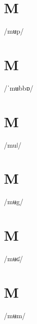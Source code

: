 \documentclass[10pt,a4paper,twoside]{book}
\begin{document}
\section*{M}

\begin{multicols}{3}
 {/mʉp/} {}
\end{multicols}

\section*{M}

\begin{multicols}{3}
 {/ˈmʉbbɒ/} {}
\end{multicols}

\section*{M}

\begin{multicols}{3}
 {/muǀ/} {}
\end{multicols}

\section*{M}

\begin{multicols}{3}
 {/mʉg/} {}
\end{multicols}

\section*{M}

\begin{multicols}{3}
 {/mʉʛ/} {}
\end{multicols}

\section*{M}

\begin{multicols}{3}
 {/mʉm/} {}
\end{multicols}
\end{document}
